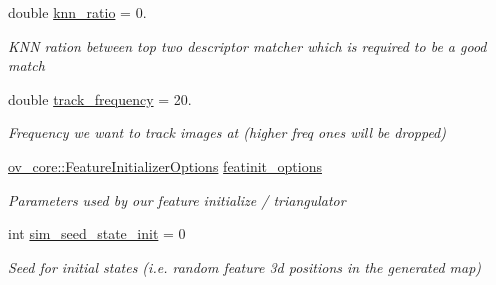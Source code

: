 \begin{DoxyCompactItemize}
\mbox{\label{structov__msckf_1_1VioManagerOptions_a62800a75870b19213d1c44e69b2c32f7}} 
double \hyperlink{structov__msckf_1_1VioManagerOptions_a62800a75870b19213d1c44e69b2c32f7}{knn\+\_\+ratio} = 0.
\begin{DoxyCompactList}\small\item\em K\+NN ration between top two descriptor matcher which is required to be a good match \end{DoxyCompactList}\item 
\mbox{\label{structov__msckf_1_1VioManagerOptions_a0911df8b2eb55f73191c9b0c815cb538}} 
double \hyperlink{structov__msckf_1_1VioManagerOptions_a0911df8b2eb55f73191c9b0c815cb538}{track\+\_\+frequency} = 20.
\begin{DoxyCompactList}\small\item\em Frequency we want to track images at (higher freq ones will be dropped) \end{DoxyCompactList}\item 
\mbox{\label{structov__msckf_1_1VioManagerOptions_a3ef0a31865f542c778762883c5d1bb11}} 
\hyperlink{structov__core_1_1FeatureInitializerOptions}{ov\+\_\+core\+::\+Feature\+Initializer\+Options} \hyperlink{structov__msckf_1_1VioManagerOptions_a3ef0a31865f542c778762883c5d1bb11}{featinit\+\_\+options}
\begin{DoxyCompactList}\small\item\em Parameters used by our feature initialize / triangulator \end{DoxyCompactList}\item 
\mbox{\label{structov__msckf_1_1VioManagerOptions_a04e82ff351254354378cd7568aaef6ed}} 
int \hyperlink{structov__msckf_1_1VioManagerOptions_a04e82ff351254354378cd7568aaef6ed}{sim\+\_\+seed\+\_\+state\+\_\+init} = 0
\begin{DoxyCompactList}\small\item\em Seed for initial states (i.\+e. random feature 3d positions in the generated map) \end{DoxyCompactList}\item 
\mbox{\label{structov__msckf_1_1VioManagerOptions_afe2c433c61d25c18901b089a2215114c}} 

\end{DoxyCompactItemize}
